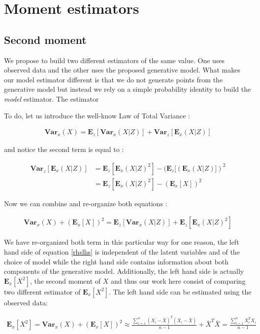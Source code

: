 \documentclass{article}
\newcommand{\Vx}{\textbf{Var}_x}
\newcommand{\Ex}{\textbf{E}_x}
\newcommand{\Vz}{\textbf{Var}_z}
\newcommand{\Ez}{\textbf{E}_z}
\begin{document}
\section{Moment estimators}

\subsection{Second moment}

We propose to build two different estimators of the same value. One uses observed data and the other uses the proposed generative model. What makes our model estimator different is that we do not generate points from the generative model but instead we rely on a simple probability identity to build the \textit{model} estimator. The estimator 

\bigskip

To do, let us introduce the well-know Law of Total Variance :


\begin{align}
\Vx(X) = \Ez[\Vx(X|Z)] + \Vz[\Ex(X|Z)]
\end{align}

and notice the second term is equal to :

\begin{align}
\Vz[\Ex(X|Z)] &= \Ez[\Ex(X|Z)^2] - (\Ez[(\Ex(X|Z)])^2 \\
&= \Ez[\Ex(X|Z)^2] - (\Ex[X])^2
\end{align}

Now we can combine and re-organize both equations :

\begin{align}
\Vx(X)+ (\Ex[X])^2 = \Ez[\Vx(X|Z)] + \Ez[\Ex(X|Z)^2]
\label{rhslhs}
\end{align}

We have re-organized both term in this particular way for one reason, the left hand side of equation \ref{rhslhs} is independent of the latent variables and of the choice of model while the right hand side contains information about both components of the generative model. Additionally, the left hand side is actually $\Ex[X^2]$, the second moment of $X$ and thus our work here consist of comparing two different estimator of $\Ex[X^2]$. The left hand side can be estimated using the observed data:  

\begin{align}
\Ex[X^2] = \Vx(X)+ (\Ex[X])^2 \approx \frac{\sum_{i=1}^n(X_i-\bar{X})^T(X_i-\bar{X})}{n-1} + \bar{X}^T\bar{X} = \frac{\sum_{i=1}^n X_i^TX_i}{n-1}
\label{lhs}
\end{align}
\end{document}

